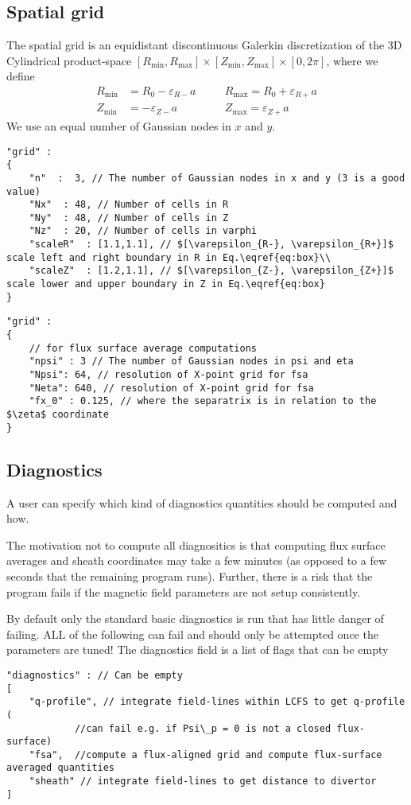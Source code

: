 \subsection{Spatial grid} \label{sec:spatial}
The spatial grid is an equidistant discontinuous Galerkin discretization of the
3D Cylindrical product-space
$[ R_{\min}, R_{\max}]\times [Z_{\min}, Z_{\max}] \times [0,2\pi]$,
where we define
\begin{align} \label{eq:box}
    R_{\min}&=R_0-\varepsilon_{R-}a\quad
    &&R_{\max}=R_0+\varepsilon_{R+}a\nonumber\\
    Z_{\min}&=-\varepsilon_{Z-}a\quad
    &&Z_{\max}=\varepsilon_{Z+}a
\end{align}
We use an equal number of Gaussian nodes in $x$ and $y$.
\begin{verbatim}
"grid" :
{
    "n"  :  3, // The number of Gaussian nodes in x and y (3 is a good value)
    "Nx"  : 48, // Number of cells in R
    "Ny"  : 48, // Number of cells in Z
    "Nz"  : 20, // Number of cells in varphi
    "scaleR"  : [1.1,1.1], // $[\varepsilon_{R-}, \varepsilon_{R+}]$ scale left and right boundary in R in Eq.\eqref{eq:box}\\
    "scaleZ"  : [1.2,1.1], // $[\varepsilon_{Z-}, \varepsilon_{Z+}]$ scale lower and upper boundary in Z in Eq.\eqref{eq:box}
}
\end{verbatim}
\begin{verbatim}
"grid" :
{
    // for flux surface average computations
    "npsi" : 3 // The number of Gaussian nodes in psi and eta
    "Npsi": 64, // resolution of X-point grid for fsa
    "Neta": 640, // resolution of X-point grid for fsa
    "fx_0" : 0.125, // where the separatrix is in relation to the $\zeta$ coordinate
}
\end{verbatim}
\subsection{Diagnostics}
A user can specify which kind of diagnostics quantities should be computed and
how.
\begin{tcolorbox}[title=Note]
The motivation not to compute all diagnositics is that computing flux
surface averages and sheath coordinates may take a few minutes (as opposed to a
few seconds that the remaining program runs).
Further, there is a risk that
the program fails if the magnetic field parameters are not setup consistently.
\end{tcolorbox}

By default only the standard basic diagnostics is run that has little danger of failing.
ALL of the following can fail and should only be attempted once the parameters are tuned!
The diagnostics field is a list of flags that can be empty
\begin{verbatim}
"diagnostics" : // Can be empty
[
    "q-profile", // integrate field-lines within LCFS to get q-profile (
            //can fail e.g. if Psi\_p = 0 is not a closed flux-surface)
    "fsa",  //compute a flux-aligned grid and compute flux-surface averaged quantities
    "sheath" // integrate field-lines to get distance to divertor
]
\end{verbatim}

